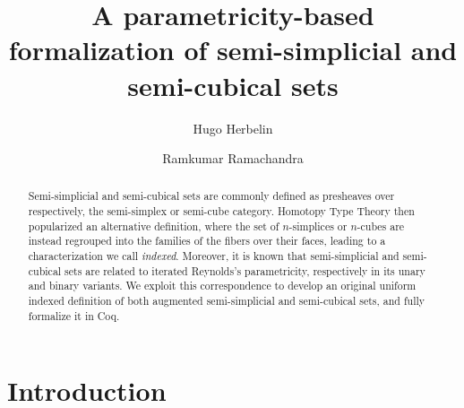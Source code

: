 \documentclass{msc}
\begin{document}
\title{A parametricity-based formalization of semi-simplicial and semi-cubical sets}
\begin{authgrp}
  \author{Hugo Herbelin}
  \author{Ramkumar Ramachandra}
\end{authgrp}
\begin{abstract}
  Semi-simplicial and semi-cubical sets are commonly defined as presheaves over respectively, the semi-simplex or semi-cube category. Homotopy Type Theory then popularized an alternative definition, where the set of $n$-simplices or $n$-cubes are instead regrouped into the families of the fibers over their faces, leading to a characterization we call \emph{indexed}. Moreover, it is known that semi-simplicial and semi-cubical sets are related to iterated Reynolds's parametricity, respectively in its unary and binary variants. We exploit this correspondence to develop an original uniform indexed definition of both augmented semi-simplicial and semi-cubical sets, and fully formalize it in Coq.
\end{abstract}
\maketitle
\vspace{-2em} %

\section{Introduction}
\end{document}
